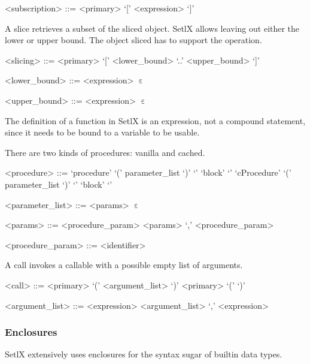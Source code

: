 \begin{grammar}
<subscription> ::= <primary> `[' <expression> `]'
\end{grammar}

%

A slice retrieves a subset of the sliced object. SetlX allows leaving out either the lower or upper bound. The object sliced has to support the operation.

\begin{grammar}
<slicing> ::= <primary> `[' <lower_bound> `..' <upper_bound> `]'

<lower_bound> ::= <expression>
\alt $\upepsilon$

<upper_bound> ::= <expression>
\alt $\upepsilon$
\end{grammar}

%

The definition of a function in SetlX is an expression, not a compound statement, since it needs to be bound to a variable to be usable.

There are two kinds of procedures: vanilla and cached.

\begin{grammar}
<procedure> ::= `procedure' `(' parameter_list `)' `{' `block' `}'
\alt `cProcedure' `(' parameter_list `)' `{' `block' `}'

<parameter_list> ::= <params>
\alt $\upepsilon$

<params> ::= <procedure_param>
\alt <params> `,' <procedure_param>

<procedure_param> ::= <identifier>
\end{grammar}

%

A call invokes a callable with a possible empty list of arguments.

\begin{grammar}
<call> ::= <primary> `(' <argument_list> `)'
\alt <primary> `(' `)'

<argument_list> ::= <expression>
\alt <argument_list> `,' <expression>
\end{grammar}

%
\subsubsection{Enclosures}

SetlX extensively uses enclosures for the syntax sugar of builtin data types.

